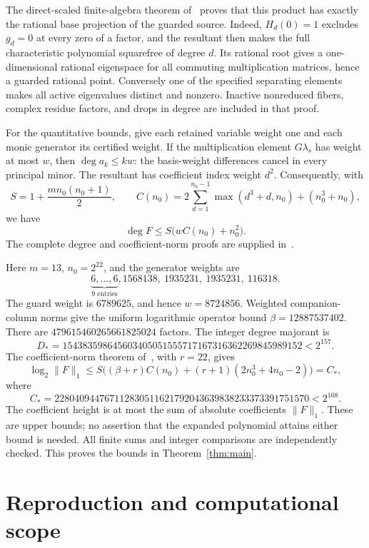 \documentclass[11pt,a4paper]{article}
\begin{document}
The direct-scaled finite-algebra theorem of~\cite{Weighted} proves
that this product has exactly the rational base projection of the
guarded source. Indeed, $H_d(0)=1$ excludes $g_d=0$ at every zero
of a factor, and the resultant then makes the full characteristic
polynomial squarefree of degree $d$. Its rational root gives a
one-dimensional rational eigenspace for all commuting multiplication
matrices, hence a guarded rational point. Conversely one of the
specified separating elements makes all active eigenvalues distinct
and nonzero. Inactive nonreduced fibers, complex residue factors,
and drops in degree are included in that proof.

For the quantitative bounds, give each retained variable weight one
and each monic generator its certified weight. If the multiplication
element $G\lambda_s$ has weight at most $w$, then
$\deg a_k\le kw$: the basis-weight differences cancel in every
principal minor. The resultant has coefficient index weight $d^2$.
Consequently, with
\[
 S=1+\frac{m n_0(n_0+1)}2,\qquad
 C(n_0)=2\sum_{d=1}^{n_0-1}\max(d^3+d,n_0)+(n_0^3+n_0),
\]
we have
\[
                      \deg F\le S\bigl(wC(n_0)+n_0^2\bigr).
\]
The complete degree and coefficient-norm proofs are supplied
in~\cite{Weighted}.

Here $m=13$, $n_0=2^{22}$, and the generator weights are
\[
 \underbrace{6,\ldots,6}_{9\text{ entries}},
 1568138,\ 1935231,\ 1935231,\ 116318.
\]
The guard weight is $6789625$, and hence $w=8724856$.
Weighted companion-column norms give the uniform logarithmic
operator bound $\beta=12887537402$. There are
$479615460265661825024$ factors.
The integer degree majorant is
\[
 D_* =154383598645603405051555717167316362269845989152
       <2^{157}.
\]
The coefficient-norm theorem of~\cite{Weighted}, with $r=22$, gives
\[
 \log_2\lVert F\rVert_1
 \le S\bigl((\beta+r)C(n_0)+(r+1)(2n_0^3+4n_0-2)\bigr)
 =C_*,
\]
where
\[
 C_* =228040944767112830511621792043639838233373391751570
       <2^{168}.
\]
The coefficient height is at most the sum of absolute coefficients
$\lVert F\rVert_1$. These are upper bounds; no assertion that the
expanded polynomial attains either bound is needed. All finite sums
and integer comparisons are independently checked. This proves the
bounds in Theorem~\ref{thm:main}.

\section{Reproduction and computational scope}
\end{document}
